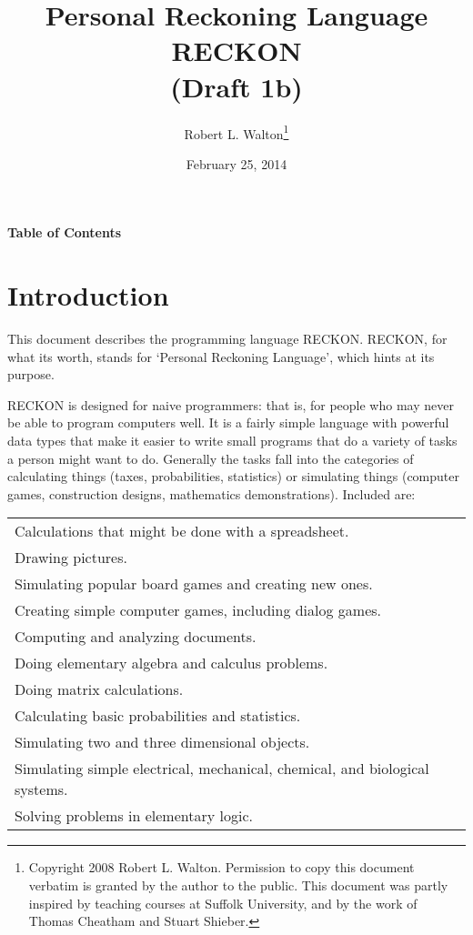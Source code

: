 \documentclass[12pt]{article}
\makeatletter
\renewcommand\tableofcontents{%
    \begin{list}{}%
	     {\setlength{\itemsep}{0in}%
	      \setlength{\topsep}{0in}%
	      \setlength{\parsep}{1ex}%
	      \setlength{\labelwidth}{0in}%
	      \setlength{\baselineskip}{1.5ex}%
	      \setlength{\leftmargin}{1.0in}%
	      \setlength{\rightmargin}{1.0in}}%
    \item\@starttoc{toc}%
    \end{list}}
\makeatother
\begin{document}
        
\title{Personal Reckoning Language\\[2ex]
       RECKON\\[2ex]
       (Draft 1b)}

\author{Robert L. Walton\thanks{Copyright 2008 Robert L. Walton.
Permission to copy this document verbatim is granted by the author
to the public.  This document was partly inspired
by teaching courses at Suffolk University, and by the work of Thomas
Cheatham and Stuart Shieber.}}

\date{February 25, 2014}
 
\maketitle

\newpage
\begin{center}
\large \bf Table of Contents
\end{center}

\bigskip

\tableofcontents 

\newpage

\section{Introduction}

This document describes the programming language RECKON.  RECKON,
for what its worth, stands for `Personal Reckoning Language',
which hints at its purpose.

RECKON is designed for naive programmers: that is, for people who may never
be able to program computers well.  It is a fairly simple language with
powerful data types that make it easier to write small programs
that do a variety of tasks a person might want to do.  Generally
the tasks fall into the categories of calculating things (taxes,
probabilities, statistics) or simulating things
(computer games, construction designs, mathematics demonstrations).
Included are:

\begin{center}
\begin{tabular}{l}
Calculations that might be done with a spreadsheet. \\
Drawing pictures. \\
Simulating popular board games and creating new ones. \\
Creating simple computer games, including dialog games. \\
Computing and analyzing documents. \\
Doing elementary algebra and calculus problems. \\
Doing matrix calculations. \\ 
Calculating basic probabilities and statistics. \\
Simulating two and three dimensional objects. \\
Simulating simple electrical, mechanical, chemical, and biological systems.\\
Solving problems in elementary logic. \\
\end{tabular}
\end{center}
\end{document}
